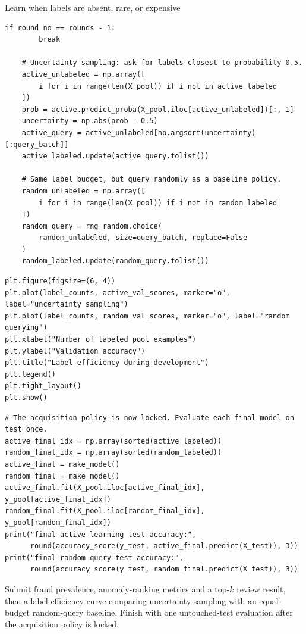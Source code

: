 \begin{labproject}{Learn when labels are absent, rare, or expensive}
\begin{lstlisting}[style=mlpython]
    if round_no == rounds - 1:
        break

    # Uncertainty sampling: ask for labels closest to probability 0.5.
    active_unlabeled = np.array([
        i for i in range(len(X_pool)) if i not in active_labeled
    ])
    prob = active.predict_proba(X_pool.iloc[active_unlabeled])[:, 1]
    uncertainty = np.abs(prob - 0.5)
    active_query = active_unlabeled[np.argsort(uncertainty)[:query_batch]]
    active_labeled.update(active_query.tolist())

    # Same label budget, but query randomly as a baseline policy.
    random_unlabeled = np.array([
        i for i in range(len(X_pool)) if i not in random_labeled
    ])
    random_query = rng_random.choice(
        random_unlabeled, size=query_batch, replace=False
    )
    random_labeled.update(random_query.tolist())
\end{lstlisting}

\begin{lstlisting}[style=mlpython]
plt.figure(figsize=(6, 4))
plt.plot(label_counts, active_val_scores, marker="o", label="uncertainty sampling")
plt.plot(label_counts, random_val_scores, marker="o", label="random querying")
plt.xlabel("Number of labeled pool examples")
plt.ylabel("Validation accuracy")
plt.title("Label efficiency during development")
plt.legend()
plt.tight_layout()
plt.show()
\end{lstlisting}

\begin{lstlisting}[style=mlpython]
# The acquisition policy is now locked. Evaluate each final model on test once.
active_final_idx = np.array(sorted(active_labeled))
random_final_idx = np.array(sorted(random_labeled))
active_final = make_model()
random_final = make_model()
active_final.fit(X_pool.iloc[active_final_idx], y_pool[active_final_idx])
random_final.fit(X_pool.iloc[random_final_idx], y_pool[random_final_idx])
print("final active-learning test accuracy:",
      round(accuracy_score(y_test, active_final.predict(X_test)), 3))
print("final random-query test accuracy:",
      round(accuracy_score(y_test, random_final.predict(X_test)), 3))
\end{lstlisting}

\end{labproject}

\begin{labdeliverable}
Submit fraud prevalence, anomaly-ranking metrics and a top-$k$ review result, then a label-efficiency curve comparing uncertainty sampling with an equal-budget random-query baseline. Finish with one untouched-test evaluation after the acquisition policy is locked.
\end{labdeliverable}
